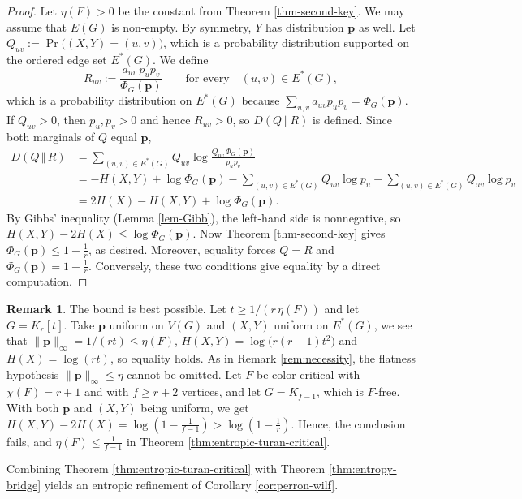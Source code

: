 \documentclass[11pt, a4paper]{article}
\theoremstyle{definition}
\newtheorem{remark}{Remark}
\theoremstyle{plain}
\renewcommand{\le}{\leqslant}
\renewcommand{\ge}{\geqslant}
\newcommand{\pmax}{\lVert \bm{p} \rVert_{\infty}}
\begin{document}
\begin{proof}
Let $\eta (F)>0$ be the constant from Theorem \ref{thm-second-key}. 
We may assume that $E(G)$ is non-empty. 
By symmetry, $Y$ has distribution $\bm{p}$ as well. 
Let $Q_{uv}:=\Pr \big( (X,Y)=(u,v) \big)$, which is a probability distribution supported on the ordered edge set $E^{*}(G)$. We define
\[
  R_{uv}:=\frac{a_{uv}\,p_up_v}{\Phi_G(\bm{p})}\qquad
  \text{for every}\quad (u,v)\in E^{*}(G) ,
\]
which is a probability distribution on $E^{*}(G)$ because
$\sum_{u,v}a_{uv}p_up_v=\Phi_G(\bm{p})$. 
If $Q_{uv}>0$, then $p_u,p_v>0$
and hence $R_{uv}>0$, so $D(Q\, \Vert \, R)$ is defined. Since both marginals of $Q$
equal $\bm{p}$,
\begin{align*}
  D(Q\, \Vert \, R)
  &=\sum_{(u,v)\in E^{*}(G)}Q_{uv}
      \log \frac{Q_{uv}\,\Phi_G(\bm{p})}{p_up_v}\\
  &=-H(X,Y)+\log \Phi_G(\bm{p})
    -\sum_{(u,v)\in E^{*}(G)}Q_{uv}\log p_u
    -\sum_{(u,v)\in E^{*}(G)}Q_{uv}\log p_v\\
  &=2H(X)-H(X,Y)+\log \Phi_G(\bm{p}).
\end{align*}
By Gibbs' inequality (Lemma \ref{lem-Gibb}), the left-hand side is nonnegative,
so $H(X,Y)-2H(X)\le \log \Phi_G(\bm{p})$. 
 Now Theorem \ref{thm-second-key} gives 
 $\Phi_G(\bm{p})\le 1-\frac1r$, as desired. 
Moreover, equality forces $Q=R$ and
$\Phi_G(\bm{p})=1-\frac1r$. 
Conversely, these two conditions give equality by a direct computation. 
\end{proof}




\begin{remark}\label{rem:entropic-necessity}
The bound is best possible. 
Let $t\ge 1/(r\,\eta (F))$ and let $G=K_r[t]$. 
Take $\bm{p}$ uniform on $V(G)$ and
$(X,Y)$ uniform on $E^{*}(G)$,  
we see that $\pmax =1/(rt)\le \eta (F)$,
$H(X,Y)=\log \bigl(r(r-1)t^{2}\bigr)$ and $H(X)=\log (rt)$, so equality holds. As in Remark \ref{rem:necessity}, 
the flatness hypothesis $\pmax \! \le  \eta$ cannot be omitted. 
 Let $F$ be color-critical with $\chi (F)=r+1$ 
 and with $f \ge r+2$ vertices, 
and let $G=K_{f -1}$, which is $F$-free. 
With both $\bm{p}$ and $(X,Y)$ being uniform, 
we get  $H(X,Y)-2H(X)=\log (1-\frac{1}{f -1} )>\log  (1-\frac1r )$. Hence, the conclusion fails, and 
$\eta (F)\le \frac{1}{f -1}$ in
Theorem \ref{thm:entropic-turan-critical}. \end{remark}

Combining Theorem \ref{thm:entropic-turan-critical} 
with Theorem \ref{thm:entropy-bridge} yields an entropic refinement of Corollary \ref{cor:perron-wilf}.
\end{document}
